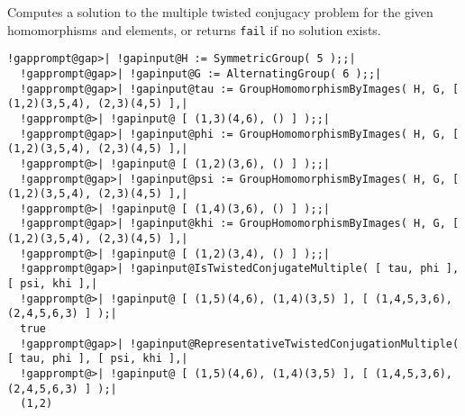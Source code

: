 \documentclass[a4paper,11pt]{report}
\begin{document}
{{{ Computes a solution to the multiple twisted conjugacy problem for the given
homomorphisms and elements, or returns \texttt{fail} if no solution exists. }

 
\begin{Verbatim}[commandchars=!@|,fontsize=\small,frame=single,label=Example]
  !gapprompt@gap>| !gapinput@H := SymmetricGroup( 5 );;|
  !gapprompt@gap>| !gapinput@G := AlternatingGroup( 6 );;|
  !gapprompt@gap>| !gapinput@tau := GroupHomomorphismByImages( H, G, [ (1,2)(3,5,4), (2,3)(4,5) ],|
  !gapprompt@>| !gapinput@ [ (1,3)(4,6), () ] );;|
  !gapprompt@gap>| !gapinput@phi := GroupHomomorphismByImages( H, G, [ (1,2)(3,5,4), (2,3)(4,5) ],|
  !gapprompt@>| !gapinput@ [ (1,2)(3,6), () ] );;|
  !gapprompt@gap>| !gapinput@psi := GroupHomomorphismByImages( H, G, [ (1,2)(3,5,4), (2,3)(4,5) ],|
  !gapprompt@>| !gapinput@ [ (1,4)(3,6), () ] );;|
  !gapprompt@gap>| !gapinput@khi := GroupHomomorphismByImages( H, G, [ (1,2)(3,5,4), (2,3)(4,5) ],|
  !gapprompt@>| !gapinput@ [ (1,2)(3,4), () ] );;|
  !gapprompt@gap>| !gapinput@IsTwistedConjugateMultiple( [ tau, phi ], [ psi, khi ],|
  !gapprompt@>| !gapinput@ [ (1,5)(4,6), (1,4)(3,5) ], [ (1,4,5,3,6), (2,4,5,6,3) ] );|
  true
  !gapprompt@gap>| !gapinput@RepresentativeTwistedConjugationMultiple( [ tau, phi ], [ psi, khi ],|
  !gapprompt@>| !gapinput@ [ (1,5)(4,6), (1,4)(3,5) ], [ (1,4,5,3,6), (2,4,5,6,3) ] );|
  (1,2)
\end{Verbatim}
 }

 }

   
\end{document}

